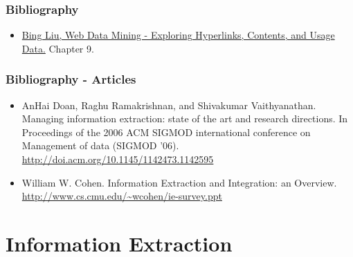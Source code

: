 \documentclass{beamer}
\subtitle{Information Extraction : An Introduction}
\begin{document}
\maketitle


\begin{frame}
    \frametitle{Bibliography}
    \begin{block}{}
        \begin{itemize}
        \item \href{https://www.cs.uic.edu/~liub/WebMiningBook.html}{Bing Liu, Web Data Mining - Exploring Hyperlinks, Contents, and Usage Data.} Chapter 9.

        \end{itemize}
    \end{block}
\end{frame}
\begin{frame}
    \frametitle{Bibliography - Articles}
    \begin{block}{}
        \begin{itemize}
        \item AnHai Doan, Raghu Ramakrishnan, and Shivakumar
            Vaithyanathan. Managing information extraction: state of the art
            and research directions. In Proceedings of the 2006 ACM SIGMOD
            international conference on Management of data (SIGMOD '06).
            \url{http://doi.acm.org/10.1145/1142473.1142595}
        \item William W. Cohen. Information Extraction and Integration: an
            Overview. \url{http://www.cs.cmu.edu/~wcohen/ie-survey.ppt}
        \end{itemize}
    \end{block}
\end{frame}

\section{Information Extraction}
\end{document}
